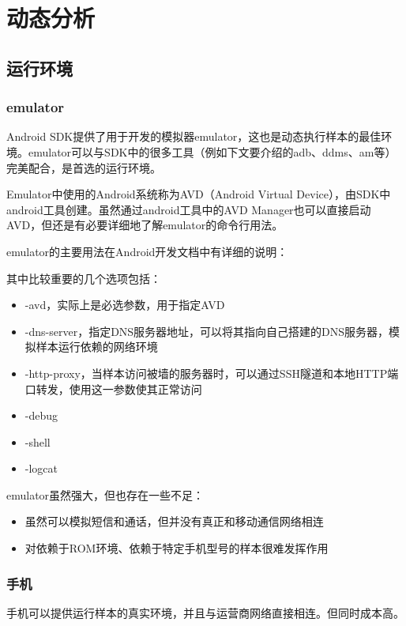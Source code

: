 \chapter{动态分析}

\section{运行环境}
\subsection{emulator}
Android SDK提供了用于开发的模拟器emulator，这也是动态执行样本的最佳环境。emulator可以与SDK中的很多工具（例如下文要介绍的adb、ddms、am等）完美配合，是首选的运行环境。

Emulator中使用的Android系统称为AVD（Android Virtual Device），由SDK中android工具创建。虽然通过android工具中的AVD Manager也可以直接启动AVD，但还是有必要详细地了解emulator的命令行用法。

emulator的主要用法在Android开发文档中有详细的说明：

其中比较重要的几个选项包括：

\begin{itemize}
\item -avd，实际上是必选参数，用于指定AVD
\item -dns-server，指定DNS服务器地址，可以将其指向自己搭建的DNS服务器，模拟样本运行依赖的网络环境
\item -http-proxy，当样本访问被墙的服务器时，可以通过SSH隧道和本地HTTP端口转发，使用这一参数使其正常访问
\item -debug
\item -shell
\item -logcat
\end{itemize}

emulator虽然强大，但也存在一些不足：

\begin{itemize}
\item 虽然可以模拟短信和通话，但并没有真正和移动通信网络相连
\item 对依赖于ROM环境、依赖于特定手机型号的样本很难发挥作用
\end{itemize}

\subsection{手机}
手机可以提供运行样本的真实环境，并且与运营商网络直接相连。但同时成本高。

